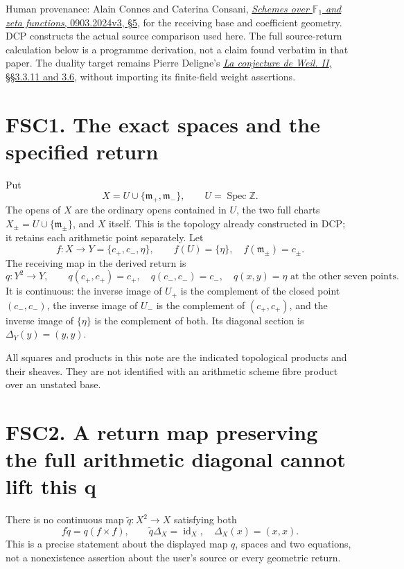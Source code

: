 Human provenance: Alain Connes and Caterina Consani,
\href{https://arxiv.org/abs/0903.2024v3}{\emph{Schemes over
\(\mathbb F_1\) and zeta functions}, 0903.2024v3, §5}, for the receiving
base and coefficient geometry. DCP constructs the actual source
comparison used here. The full source-return calculation below is a
programme derivation, not a claim found verbatim in that paper. The
duality target remains Pierre Deligne's
\href{https://www.numdam.org/item/PMIHES_1980__52__137_0/}{\emph{La
conjecture de Weil. II}, §§3.3.11 and 3.6}, without importing its
finite-field weight assertions.

\section{FSC1. The exact spaces and the specified
return}\label{fsc1.-the-exact-spaces-and-the-specified-return}

Put \[
X=U\cup\{\mathfrak m_+,\mathfrak m_-\},\qquad U=\operatorname{Spec}\mathbb Z.
\] The opens of \(X\) are the ordinary opens contained in \(U\), the two
full charts \(X_\pm=U\cup\{\mathfrak m_\pm\}\), and \(X\) itself. This
is the topology already constructed in DCP; it retains each arithmetic
point separately. Let \[
f:X\to Y=\{c_+,c_-,\eta\},\qquad f(U)=\{\eta\},\quad f(\mathfrak m_\pm)=c_\pm.
\tag{FSC1.1}
\] The receiving map in the derived return is \[
q:Y^2\to Y,\qquad
q(c_+,c_+)=c_+,\quad q(c_-,c_-)=c_-,\quad
q(x,y)=\eta\text{ at the other seven points}.
\tag{FSC1.2}
\] It is continuous: the inverse image of \(U_+\) is the complement of
the closed point \((c_-,c_-)\), the inverse image of \(U_-\) is the
complement of \((c_+,c_+)\), and the inverse image of \(\{\eta\}\) is
the complement of both. Its diagonal section is \(\Delta_Y(y)=(y,y)\).

All squares and products in this note are the indicated topological
products and their sheaves. They are not identified with an arithmetic
scheme fibre product over an unstated base.

\section{FSC2. A return map preserving the full arithmetic diagonal
cannot lift this
q}\label{fsc2.-a-return-map-preserving-the-full-arithmetic-diagonal-cannot-lift-this-q}

There is no continuous map \(\widetilde q:X^2\to X\) satisfying both \[
f\widetilde q=q(f\times f),\qquad \widetilde q\Delta_X=\operatorname{id}_X,
\quad\Delta_X(x)=(x,x).
\tag{FSC2.1}
\] This is a precise statement about the displayed map \(q\), spaces and
two equations, not a nonexistence assertion about the user's source or
every geometric return.

